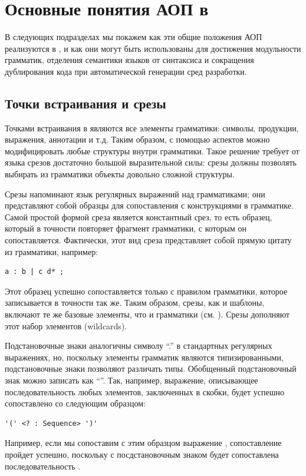 \section{Основные понятия АОП в }

В следующих подразделах мы покажем как эти общие положения АОП реализуются в , и как они могут быть использованы для достижения модульности грамматик, отделения семантики языков от синтаксиса и сокращения дублирования кода при автоматической генерации сред разработки.

\subsection{Точки встраивания и срезы}

Точками встраивания в  являются все элементы грамматики: символы, продукции, выражения, аннотации и т.д. Таким образом, с помощью аспектов можно модифицировать любые структуры внутри грамматики. Такое решение требует от языка срезов достаточно большой выразительной силы: срезы должны позволять выбирать из грамматики объекты довольно сложной структуры.

Срезы напоминают язык регулярных выражений над грамматиками; они представляют собой образцы для сопоставления с конструкциями в грамматике. Самой простой формой среза является константный срез, то есть образец, который в точности повторяет фрагмент грамматики, с которым он сопоставляется. Фактически, этот вид среза представляет собой прямую цитату из грамматики, например:
\begin{lstlisting}
a : b | c d* ;
\end{lstlisting}
Этот образец успешно сопоставляется только с правилом грамматики, которое записывается в точности так же. Таким образом, срезы, как и шаблоны, включают те же базовые элементы, что и грамматики (см. ). Срезы дополняют этот набор элементов  (wildcards).

Подстановочные знаки аналогичны символу ``.'' в стандартных регулярных выражениях, но, поскольку элементы грамматик являются типизированными, подстановочные знаки позволяют различать типы. Обобщенный подстановочный знак можно записать как ``''. Так, например, выражение, описывающее последовательность любых элементов, заключенных в скобки, будет успешно сопоставлено со следующим образцом:
\begin{lstlisting}
'(' <? : Sequence> ')'
\end{lstlisting}
Например, если мы сопоставим с этим образцом выражение , сопоставление пройдет успешно, поскольку с посдстановочным знаком будет сопоставлена последовательность .

